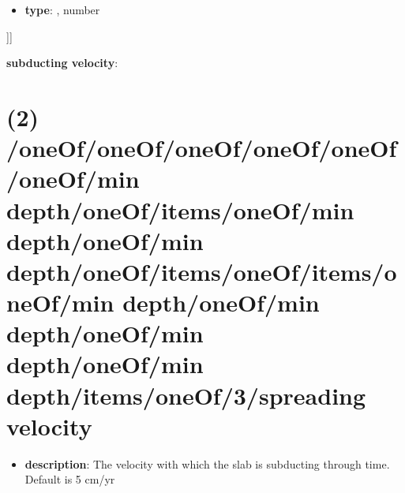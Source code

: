 \begin{itemize}[leftmargin=7em]\item {\bf type}: , number\end{itemize}]]\item {\bf subducting velocity}: \section{(2) /oneOf/oneOf/oneOf/oneOf/oneOf/oneOf/min depth/oneOf/items/oneOf/min depth/oneOf/min depth/oneOf/items/oneOf/items/oneOf/min depth/oneOf/min depth/oneOf/min depth/oneOf/min depth/items/oneOf/3/spreading velocity}
\begin{itemize}[leftmargin=2em]\item {\bf description}: The velocity with which the slab is subducting through time. Default is 5 cm/yr
\end{itemize}
